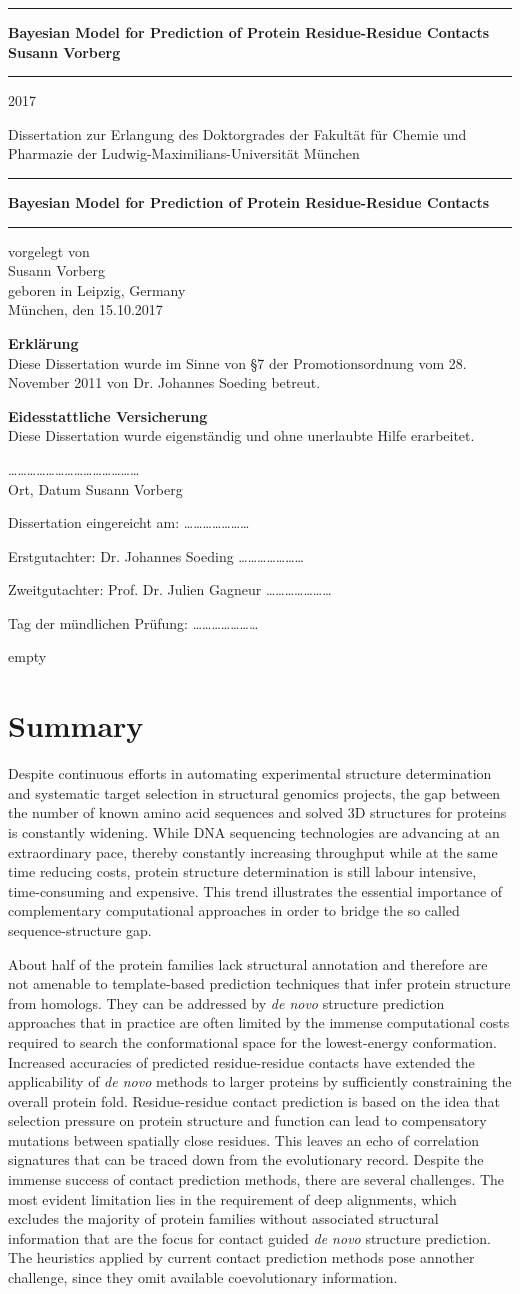 \documentclass[11pt,a4paper,twoside]{book}
\newcommand{\LMUCover}[3]{
    \thispagestyle{empty}
    {\parindent0cm \rule{\linewidth}{.7ex}}
    
    \begin{flushright}
      \vspace*{\stretch{1}}
      \sffamily\bfseries\Huge
      #1\\
      \vspace*{\stretch{1}}
      \sffamily\bfseries\large
      #2
      \vspace*{\stretch{1}}
    \end{flushright}
  
    \rule{\linewidth}{.7ex}
    \vspace*{\stretch{5}}
    \vspace*{\stretch{1}}
    
    \begin{center}\sffamily\LARGE{#3}\end{center}
}
\newcommand{\LMUTitlePage}[4]{
    \thispagestyle{empty}
    \vspace*{\stretch{1}}
    
    \begin{center}
      \Large Dissertation zur Erlangung des Doktorgrades der Fakultät für Chemie und Pharmazie der Ludwig-Maximilians-Universität München
    \end{center}
    
    \vspace*{\stretch{1}}
    {\parindent0cm \rule{\linewidth}{.7ex}}
    
    \begin{flushright}
      \vspace*{\stretch{1}}
      \sffamily\bfseries\Huge
      #1\\
      \vspace*{\stretch{1}}
    \end{flushright}
  
    \rule{\linewidth}{.7ex}

    \vspace*{\stretch{3}}
    \begin{center}
      \Large vorgelegt von\\
      \Large #2\\
      \Large geboren in #3\\
      \vspace*{\stretch{2}}
      \Large München, den #4
    \end{center}
}
\newcommand{\LMUErklaerung}[5]{
    \thispagestyle{empty}
    \begin{flushleft}
      \large \textbf{Erklärung} \\[1mm]
      \large Diese Dissertation wurde im Sinne von §7 der Promotionsordnung vom 28. November 2011 von #2 betreut.
      \bigskip
  
      \large \textbf{Eidesstattliche Versicherung}\\[1mm]
      \large Diese Dissertation wurde eigenständig und ohne unerlaubte Hilfe erarbeitet.
      \vspace{5em}
  
      \dots\dots\dots   \dots\dots\dots \hfill \dots\dots\dots\dots\dots\dots\dots\dots\\
      \large Ort, Datum \hfill #1
      \vfill
  
  
      \large Dissertation eingereicht am: \hfill  \dots\dots\dots\dots\dots\dots\dots
      \bigskip
    
      \large Erstgutachter:  #2 \hfill \dots\dots\dots\dots\dots\dots\dots
      \bigskip
    
      \large Zweitgutachter: #3 \hfill \dots\dots\dots\dots\dots\dots\dots
      \bigskip
    
      \large Tag der mündlichen Prüfung: \hfill  \dots\dots\dots\dots\dots\dots\dots
    \end{flushleft}
}
\theoremstyle{definition}
\theoremstyle{definition}
\theoremstyle{remark}
\begin{document}
\frontmatter

\LMUCover
	{Bayesian Model for Prediction of Protein Residue-Residue Contacts}
	{Susann Vorberg}
	{2017}

\newpage
\thispagestyle{empty}
\cleardoublepage

\LMUTitlePage
	{Bayesian Model for Prediction of Protein Residue-Residue Contacts}
	{Susann Vorberg}
	{Leipzig, Germany}
	{15.10.2017}

\newpage
\thispagestyle{empty}
\cleardoublepage

\LMUErklaerung
	{Susann Vorberg}
	{Dr. Johannes Soeding}
	{Prof. Dr. Julien Gagneur}

\newpage
\thispagestyle{empty}
\cleardoublepage
\frontmatter\setcounter{page}{1}

\chapter*{Summary}\label{summary}

Despite continuous efforts in automating experimental structure
determination and systematic target selection in structural genomics
projects, the gap between the number of known amino acid sequences and
solved 3D structures for proteins is constantly widening. While DNA
sequencing technologies are advancing at an extraordinary pace, thereby
constantly increasing throughput while at the same time reducing costs,
protein structure determination is still labour intensive,
time-consuming and expensive. This trend illustrates the essential
importance of complementary computational approaches in order to bridge
the so called sequence-structure gap.

About half of the protein families lack structural annotation and
therefore are not amenable to template-based prediction techniques that
infer protein structure from homologs. They can be addressed by \emph{de
novo} structure prediction approaches that in practice are often limited
by the immense computational costs required to search the conformational
space for the lowest-energy conformation. Increased accuracies of
predicted residue-residue contacts have extended the applicability of
\emph{de novo} methods to larger proteins by sufficiently constraining
the overall protein fold. Residue-residue contact prediction is based on
the idea that selection pressure on protein structure and function can
lead to compensatory mutations between spatially close residues. This
leaves an echo of correlation signatures that can be traced down from
the evolutionary record. Despite the immense success of contact
prediction methods, there are several challenges. The most evident
limitation lies in the requirement of deep alignments, which excludes
the majority of protein families without associated structural
information that are the focus for contact guided \emph{de novo}
structure prediction. The heuristics applied by current contact
prediction methods pose annother challenge, since they omit available
coevolutionary information.
\end{document}

